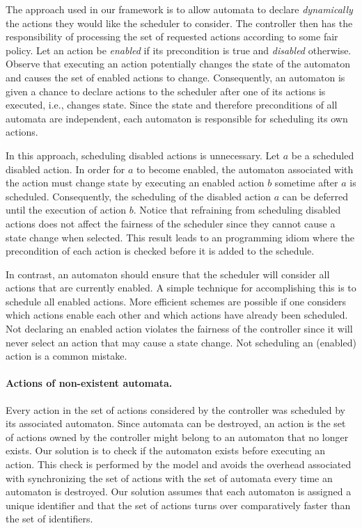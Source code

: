 The approach used in our framework is to allow automata to declare \emph{dynamically} the actions they would like the scheduler to consider.
The controller then has the responsibility of processing the set of requested actions according to some fair policy.
Let an action be \emph{enabled} if its precondition is true and \emph{disabled} otherwise.
Observe that executing an action potentially changes the state of the automaton and causes the set of enabled actions to change.
Consequently, an automaton is given a chance to declare actions to the scheduler after one of its actions is executed, i.e., changes state.
Since the state and therefore preconditions of all automata are independent, each automaton is responsible for scheduling its own actions.

In this approach, scheduling disabled actions is unnecessary.
Let $a$ be a scheduled disabled action.
In order for $a$ to become enabled, the automaton associated with the action must change state by executing an enabled action $b$ sometime after $a$ is scheduled.
Consequently, the scheduling of the disabled action $a$ can be deferred until the execution of action $b$.
Notice that refraining from scheduling disabled actions does not affect the fairness of the scheduler since they cannot cause a state change when selected.
This result leads to an programming idiom where the precondition of each action is checked before it is added to the schedule.

In contrast, an automaton should ensure that the scheduler will consider all actions that are currently enabled.
A simple technique for accomplishing this is to schedule all enabled actions.
More efficient schemes are possible if one considers which actions enable each other and which actions have already been scheduled.
Not declaring an enabled action violates the fairness of the controller since it will never select an action that may cause a state change.
Not scheduling an (enabled) action is a common mistake.

\paragraph{Actions of non-existent automata.}
Every action in the set of actions considered by the controller was scheduled by its associated automaton.
Since automata can be destroyed, an action is the set of actions owned by the controller might belong to an automaton that no longer exists.
Our solution is to check if the automaton exists before executing an action.
This check is performed by the model and avoids the overhead associated with synchronizing the set of actions with the set of automata every time an automaton is destroyed.
Our solution assumes that each automaton is assigned a unique identifier and that the set of actions turns over comparatively faster than the set of identifiers.

